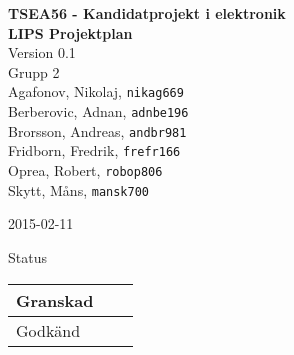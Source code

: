 \documentclass[11pt]{article}
\date{}
\begin{document}
\begin{titlepage}
\begin{center}
{\Large\bfseries TSEA56 - Kandidatprojekt i elektronik \\ LIPS Projektplan}\\
%
\vspace{2\baselineskip}
%
Version 0.1\\
\vspace{2\baselineskip}
%
Grupp 2 \\
Agafonov, Nikolaj, 
\texttt{nikag669}
\\
Berberovic, Adnan, 
\texttt{adnbe196}
\\
Brorsson, Andreas, 
\texttt{andbr981}
\\
Fridborn, Fredrik, 
\texttt{frefr166}
\\
Oprea, Robert, 
\texttt{robop806}
\\
Skytt, Måns, 
\texttt{mansk700}

\vspace{2\baselineskip}
2015-02-11

\vspace{25\baselineskip}
Status
\begin{longtable}{|l|l|l|} \hline

Granskad &
 & 
 \\ \hline
Godkänd &
 &
 \\ \hline
 
\end{longtable}

\end{center}
\end{titlepage}
\end{document}
